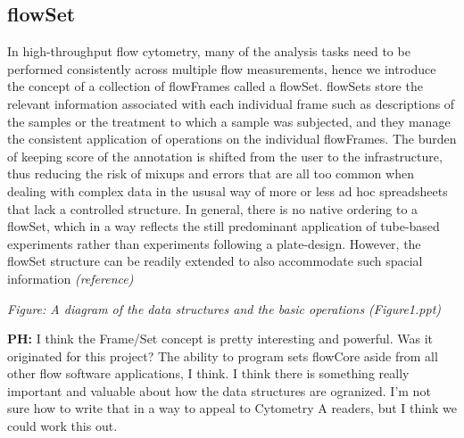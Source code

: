 \documentclass[12pt]{article}
\begin{document}
\subsection{flowSet}
In high-throughput flow cytometry, many of the analysis tasks need to
be performed consistently across multiple flow measurements, hence we
introduce the concept of a collection of flowFrames called a
flowSet. flowSets store the relevant information associated with each
individual frame such as descriptions of the samples or the treatment
to which a sample was subjected, and they manage the consistent
application of operations on the individual flowFrames. The burden of
keeping score of the annotation is shifted from the user to the
infrastructure, thus reducing the risk of mixups and errors that are
all too common when dealing with complex data in the ususal way of
more or less ad hoc spreadsheets that lack a controlled structure. In
general, there is no native ordering to a flowSet, which in a way
reflects the still predominant application of tube-based experiments
rather than experiments following a plate-design. However, the flowSet
structure can be readily extended to also accommodate such spacial
information \textit{(reference)}


\textit{Figure: A diagram of the data structures and the basic
  operations (Figure1.ppt)}

{\bf PH:} I think the Frame/Set concept is pretty interesting and
powerful. Was it originated for this project? The ability to program
sets flowCore aside from all other flow software applications, I
think. I think there is something really important and valuable about
how the data structures are ogranized. I'm not sure how to write that
in a way to appeal to Cytometry A readers, but I think we could work
this out.
\end{document}
